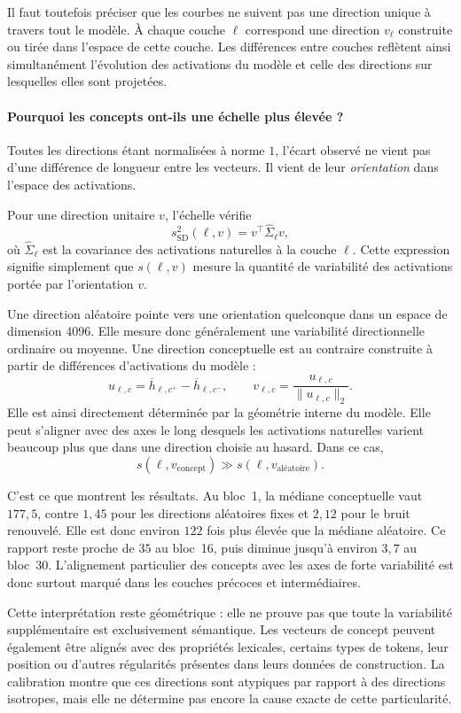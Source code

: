 \documentclass[a4paper,10pt]{article}
\begin{document}
Il faut toutefois préciser que les courbes ne suivent pas une direction unique
à travers tout le modèle. À chaque couche $\ell$ correspond une direction
$v_\ell$ construite ou tirée dans l'espace de cette couche. Les différences
entre couches reflètent ainsi simultanément l'évolution des activations du
modèle et celle des directions sur lesquelles elles sont projetées.

\paragraph{Pourquoi les concepts ont-ils une échelle plus élevée ?}

Toutes les directions étant normalisées à norme $1$, l'écart observé ne vient
pas d'une différence de longueur entre les vecteurs. Il vient de leur
\emph{orientation} dans l'espace des activations.

Pour une direction unitaire $v$, l'échelle vérifie
\[
s_{\mathrm{SD}}^2(\ell,v)
=
v^\top\widehat{\Sigma}_{\ell}v,
\]
où $\widehat{\Sigma}_{\ell}$ est la covariance des activations naturelles à la
couche $\ell$. Cette expression signifie simplement que $s(\ell,v)$ mesure la
quantité de variabilité des activations portée par l'orientation $v$.

Une direction aléatoire pointe vers une orientation quelconque dans un espace
de dimension $4096$. Elle mesure donc généralement une variabilité
directionnelle ordinaire ou moyenne. Une direction conceptuelle est au
contraire construite à partir de différences d'activations du modèle :
\[
u_{\ell,c}
=
\overline{h}_{\ell,c^{+}}
-
\overline{h}_{\ell,c^{-}},
\qquad
v_{\ell,c}
=
\frac{u_{\ell,c}}{\lVert u_{\ell,c}\rVert_2}.
\]
Elle est ainsi directement déterminée par la géométrie interne du modèle. Elle
peut s'aligner avec des axes le long desquels les activations naturelles varient
beaucoup plus que dans une direction choisie au hasard. Dans ce cas,
\[
s(\ell,v_{\mathrm{concept}})
\gg
s(\ell,v_{\mathrm{aléatoire}}).
\]

C'est ce que montrent les résultats. Au bloc~1, la médiane conceptuelle vaut
$177{,}5$, contre $1{,}45$ pour les directions aléatoires fixes et $2{,}12$
pour le bruit renouvelé. Elle est donc environ $122$ fois plus élevée que la
médiane aléatoire. Ce rapport reste proche de $35$ au bloc~16, puis diminue
jusqu'à environ $3{,}7$ au bloc~30. L'alignement particulier des concepts avec
les axes de forte variabilité est donc surtout marqué dans les couches
précoces et intermédiaires.

Cette interprétation reste géométrique : elle ne prouve pas que toute la
variabilité supplémentaire est exclusivement sémantique. Les vecteurs de
concept peuvent également être alignés avec des propriétés lexicales, certains
types de tokens, leur position ou d'autres régularités présentes dans leurs
données de construction. La calibration montre que ces directions sont
atypiques par rapport à des directions isotropes, mais elle ne détermine pas
encore la cause exacte de cette particularité.
\end{document}
